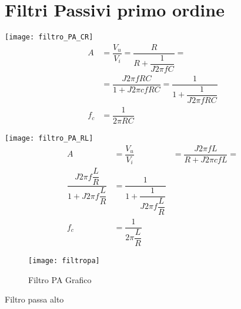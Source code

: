 \chapter{Filtri Passivi primo ordine}
\label{cha:Filtripassiviprimoord}
\begin{table}
\centering
     \begin{minipage}{0.4\textwidth}
      \centering
       \texttt{[image: filtro\_PA\_CR]}
\centering
 \begin{align*}
A&=\dfrac{V_{u}}{V_{i}}
=\dfrac{R}{R+\dfrac{1}{J2\pi fC}}=\\
&=\dfrac{J2\pi fRC}{1+J2\pi cfRC}=
\dfrac{1}{1+\dfrac{1}{J2\pi fRC}}\\
f_{c}&=\dfrac{1}{2\pi RC}
        \end{align*}
       \end{minipage}\hfill
\begin{minipage}[t]{0.4\textwidth}
      \centering
\texttt{[image: filtro\_PA\_RL]}
\centering
     \begin{align*}
A&=\dfrac{V_{u}}{V_{i}}&=\dfrac{J2\pi fL}{R+J2\pi cfL}=\\
\dfrac{J2\pi f\dfrac{L}{R}}{1+J2\pi f\dfrac{L}{R}}
&=\dfrac{1}{1+\dfrac{1}{J2\pi f\dfrac{L}{R}}}\\
f_{c}&=\dfrac{1}{2\pi \dfrac{L}{R}}
        \end{align*}
     \end{minipage}
 \begin{subfigure}[b]{.5\linewidth}
 	\centering\texttt{[image: filtropa]}
 	\caption{Filtro PA Grafico}
 \end{subfigure}
\caption{Filtro passa alto}
\label{tab:filtropassaalto}
\end{table}
